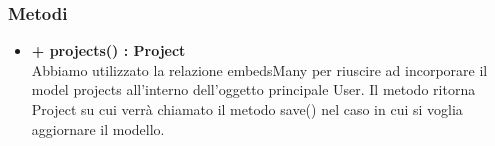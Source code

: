 	\subsubsection*{Metodi}
	\begin{itemize}
		\item \textbf{+ projects() : Project}\\
		Abbiamo utilizzato la relazione embedsMany per riuscire ad incorporare il model projects all'interno dell'oggetto principale User. Il metodo ritorna Project su cui verrà chiamato il metodo save() nel caso in cui si voglia aggiornare il modello.
	\end{itemize}